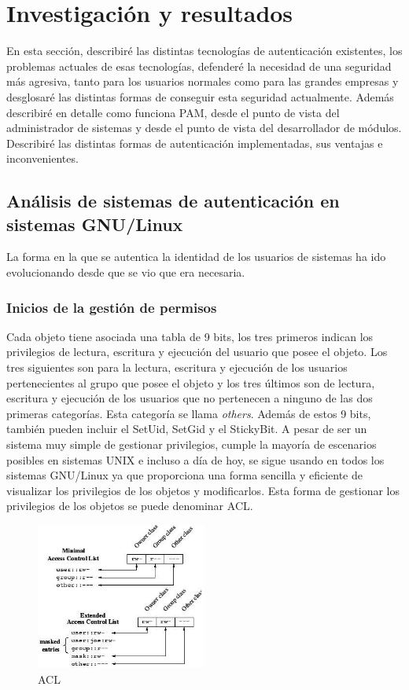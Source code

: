 \documentclass[titlepage, 12pt, a4paper]{article}
\begin{document}
\section{Investigación y resultados}
En esta sección, describiré las distintas tecnologías de autenticación existentes, los problemas actuales de esas tecnologías, defenderé la necesidad de una seguridad más agresiva, tanto para los usuarios normales como para las grandes empresas y desglosaré las distintas formas de conseguir esta seguridad actualmente. Además describiré en detalle como funciona PAM, desde el punto de vista del administrador de sistemas y desde el punto de vista del desarrollador de módulos. Describiré las distintas formas de autenticación implementadas, sus ventajas e inconvenientes.
\subsection{Análisis de sistemas de autenticación en sistemas \Gls{GNU/Linux}}
La forma en la que se autentica la identidad de los usuarios de sistemas ha ido evolucionando desde que se vio que era necesaria.
\subsubsection{Inicios de la gestión de permisos}
Cada objeto tiene asociada una tabla de 9 bits, los tres primeros indican los privilegios de lectura, escritura y ejecución del usuario que posee el objeto. Los tres siguientes son para la lectura, escritura y ejecución de los usuarios pertenecientes al grupo que posee el objeto y los tres últimos son de lectura, escritura y ejecución de los usuarios que no pertenecen a ninguno de las dos primeras categorías. Esta categoría se llama \textit{others}. Además de estos 9 bits, también pueden incluir el \Gls{SetUid}, \Gls{SetGid} y el \Gls{StickyBit}. A pesar de ser un sistema muy simple de gestionar privilegios, cumple la mayoría de escenarios posibles en sistemas UNIX e incluso a día de hoy, se sigue usando en todos los sistemas \Gls{GNU/Linux} ya que proporciona una forma sencilla y eficiente de visualizar los privilegios de los objetos y modificarlos. Esta forma de gestionar los privilegios de los objetos se puede denominar \Gls{ACL}.
\begin{figure}[H]
    \centering
    \includegraphics[width=0.5\textwidth]{Media/ACL.jpg}
    \caption{\Gls{ACL}}
    \label{fig:ACL}
\end{figure}
\end{document}
